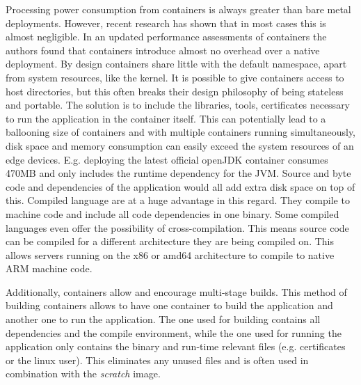 Processing power consumption from containers is always greater than bare metal deployments. However, recent research has shown that in most cases this is almost negligible. In an updated performance assessments of containers the authors found that containers introduce almost no overhead over a native deployment\cite{felter2015updatedPerformanceContainers}. By design containers share little with the default namespace, apart from system resources, like the kernel. It is possible to give containers access to host directories, but this often breaks their design philosophy of being stateless and portable. The solution is to include the libraries, tools, certificates necessary to run the application in the container itself. This can potentially lead to a ballooning size of containers and with multiple containers running simultaneously, disk space and memory consumption can easily exceed the system resources of an edge devices. E.g. deploying the latest official openJDK container consumes 470MB and only includes the runtime dependency for the JVM. Source and byte code and dependencies of the application would all add extra disk space on top of this. Compiled language are at a huge advantage in this regard. They compile to machine code and include all code dependencies in one binary. Some compiled languages even offer the possibility of cross-compilation. This means source code can be compiled for a different architecture they are being compiled on. This allows servers running on the x86 or amd64 architecture to compile to native ARM machine code.

Additionally, containers allow and encourage multi-stage builds. This method of building containers allows to have one container to build the application and another one to run the application. The one used for building contains all dependencies and the compile environment, while the one used for running the application only contains the binary and run-time relevant files (e.g. certificates or the linux user). This eliminates any unused files and is often used in combination with the \textit{scratch} image. 

